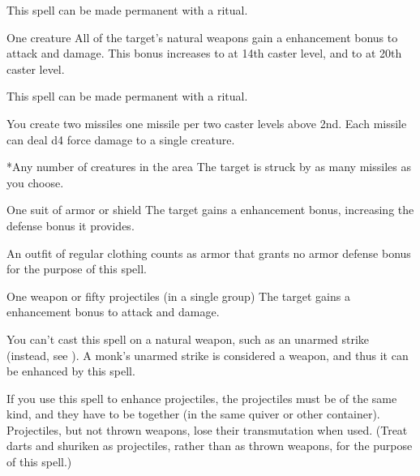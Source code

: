 This spell can be made permanent with a  ritual.

\spellrng{\rngclose}
\spelldur{\durshort}
\begin{spelltarget}{One creature}
    \spelleffect All of the target's natural weapons gain a  enhancement bonus to attack and damage. This bonus increases to  at 14th caster level, and to  at 20th caster level.
\end{spelltarget}
\spellnotes This spell can be made permanent with a  ritual.

\spellline
\spellspecial You create two missiles \add one missile per two caster levels above 2nd. Each missile can deal d4 force damage to a single creature.
\begin{spelltargets}*{Any number of creatures in the area}
    \spelleffect The target is struck by as many missiles as you choose.
\end{spelltargets}

\spellrng{\rngclose}
\spelldur{\durmed}
\begin{spelltarget}{One suit of armor or shield}
    \spelleffect The target gains a  enhancement bonus, increasing the defense bonus it provides. \spellbonusscalingdescription
\end{spelltarget}
\spellnotes An outfit of regular clothing counts as armor that grants no armor defense bonus for the purpose of this spell.

\spellrng{\rngclose}
\spelldur{\durshort}
\begin{spelltarget}{One weapon or fifty projectiles (in a single group)}
    \spelleffect The target gains a  enhancement bonus to attack and damage. \spellbonusscalingdescription
\end{spelltarget}
\spellnotes You can't cast this spell on a natural weapon, such as an unarmed strike (instead, see ). A monk's unarmed strike is considered a weapon, and thus it can be enhanced by this spell.
\par If you use this spell to enhance projectiles, the projectiles must be of the same kind, and they have to be together (in the same quiver or other container). Projectiles, but not thrown weapons, lose their transmutation when used. (Treat darts and shuriken as projectiles, rather than as thrown weapons, for the purpose of this spell.)

